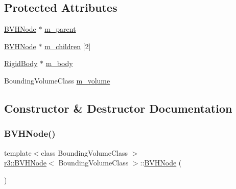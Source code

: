 \subsection*{Protected Attributes}
\begin{DoxyCompactItemize}
\item 
\mbox{\hyperlink{classr3_1_1_b_v_h_node}{B\+V\+H\+Node}} $\ast$ \mbox{\hyperlink{classr3_1_1_b_v_h_node_a62424473dd79cf59262a6a53995b0e26}{m\+\_\+parent}}
\item 
\mbox{\hyperlink{classr3_1_1_b_v_h_node}{B\+V\+H\+Node}} $\ast$ \mbox{\hyperlink{classr3_1_1_b_v_h_node_ac3df92e9a175e4037a07801e1cca73db}{m\+\_\+children}} \mbox{[}2\mbox{]}
\item 
\mbox{\hyperlink{classr3_1_1_rigid_body}{Rigid\+Body}} $\ast$ \mbox{\hyperlink{classr3_1_1_b_v_h_node_a7f1a7f51f17ed00cc39298ff4d1f1d57}{m\+\_\+body}}
\item 
Bounding\+Volume\+Class \mbox{\hyperlink{classr3_1_1_b_v_h_node_a114366b1f5cbb56f6f650f9c794258a7}{m\+\_\+volume}}
\end{DoxyCompactItemize}


\subsection{Constructor \& Destructor Documentation}
\mbox{\label{classr3_1_1_b_v_h_node_a31b8beb2d10f5df915be92eab4bdd7f6}} 
\subsubsection{\texorpdfstring{B\+V\+H\+Node()}{BVHNode()}\hspace{0.1cm}{\footnotesize\ttfamily [1/2]}}
{\footnotesize\ttfamily template$<$class Bounding\+Volume\+Class $>$ \\
\mbox{\hyperlink{classr3_1_1_b_v_h_node}{r3\+::\+B\+V\+H\+Node}}$<$ Bounding\+Volume\+Class $>$\+::\mbox{\hyperlink{classr3_1_1_b_v_h_node}{B\+V\+H\+Node}} (\begin{DoxyParamCaption}{ }\end{DoxyParamCaption})\hspace{0.3cm}{\ttfamily [default]}}

\mbox{\label{classr3_1_1_b_v_h_node_a983ae7d4ab515427436692b8a846da6f}} 

